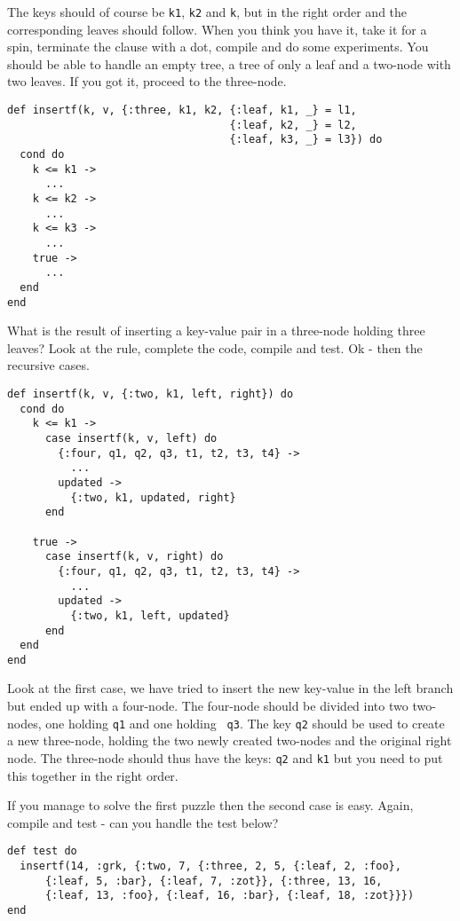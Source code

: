 \documentclass[a4paper,11pt]{article}
\begin{document}
The keys should of course be {\tt k1}, {\tt k2} and {\tt k}, but in
the right order and the corresponding leaves should follow. When you
think you have it, take it for a spin, terminate the clause with a dot,
compile and do some experiments. You should be able to handle an empty
tree, a tree of only a leaf and a two-node with two leaves. If you got
it, proceed to the three-node.

\begin{verbatim}
def insertf(k, v, {:three, k1, k2, {:leaf, k1, _} = l1,
                                   {:leaf, k2, _} = l2,
                                   {:leaf, k3, _} = l3}) do
  cond do
    k <= k1 ->
      ...
    k <= k2 ->
      ...
    k <= k3 ->
      ...
    true ->
      ...
  end
end
\end{verbatim}


What is the result of inserting a key-value pair in a three-node
holding three leaves? Look at the rule, complete the code, compile and
test. Ok - then the recursive cases.

\begin{verbatim}
def insertf(k, v, {:two, k1, left, right}) do
  cond do
    k <= k1 ->
      case insertf(k, v, left) do
        {:four, q1, q2, q3, t1, t2, t3, t4} ->
          ...
        updated ->
          {:two, k1, updated, right}
      end

    true ->
      case insertf(k, v, right) do
        {:four, q1, q2, q3, t1, t2, t3, t4} ->
          ...
        updated ->
          {:two, k1, left, updated}
      end
  end
end
\end{verbatim}

Look at the first case, we have tried to insert the new key-value in
the left branch but ended up with a four-node. The four-node should be
divided into two two-nodes, one holding {\tt q1} and one holding {\tt
  q3}. The key {\tt q2} should be used to create a new three-node,
holding the two newly created two-nodes and the original right
node. The three-node should thus have the keys: {\tt q2} and {\tt k1} but
you need to put this together in the right order.

If you manage to solve the first puzzle then the second case is
easy. Again, compile and test - can you handle the test below?

\begin{verbatim}
def test do
  insertf(14, :grk, {:two, 7, {:three, 2, 5, {:leaf, 2, :foo},
      {:leaf, 5, :bar}, {:leaf, 7, :zot}}, {:three, 13, 16,
      {:leaf, 13, :foo}, {:leaf, 16, :bar}, {:leaf, 18, :zot}}})
end
\end{verbatim}
\end{document}
